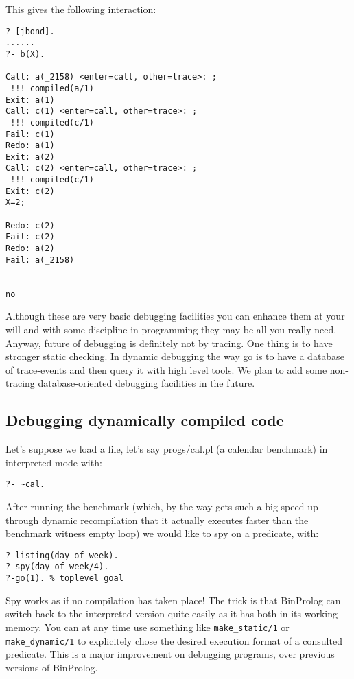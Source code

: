\documentclass{article}
\begin{document}
{\flushleft This} gives the following interaction:


{\small \begin{verbatim}
?-[jbond].
......
?- b(X).

Call: a(_2158) <enter=call, other=trace>: ;
 !!! compiled(a/1)
Exit: a(1)
Call: c(1) <enter=call, other=trace>: ;
 !!! compiled(c/1)
Fail: c(1)
Redo: a(1)
Exit: a(2)
Call: c(2) <enter=call, other=trace>: ;
 !!! compiled(c/1)
Exit: c(2)
X=2;

Redo: c(2)
Fail: c(2)
Redo: a(2)
Fail: a(_2158)


no
\end{verbatim}}

{\flushleft Although} these are very basic debugging facilities you can
enhance them at your will and with some discipline in programming they
may be all you really need.  Anyway, future of debugging is definitely
not by tracing.  One thing is to have stronger static checking. In
dynamic debugging the way go is to have a database of trace-events and
then query it with high level tools.  We plan to add some non-tracing
database-oriented debugging facilities in the future.

\subsection{Debugging dynamically compiled code}

Let's suppose we load a file, let's say progs/cal.pl (a calendar
benchmark) in interpreted mode with:

\begin{verbatim}
?- ~cal.
\end{verbatim}

After running the benchmark (which, by the way gets such a big
speed-up through dynamic recompilation that it actually executes
faster than the benchmark witness empty loop) we would like to spy
on a predicate, with:

\begin{verbatim}
?-listing(day_of_week).
?-spy(day_of_week/4).
?-go(1). % toplevel goal
\end{verbatim}

Spy works as if no compilation has taken place! The trick is
that BinProlog can switch back to the interpreted version quite easily
as it has both in its working memory. You can at any time use
something like {\tt make\_static/1} or {\tt make\_dynamic/1} to explicitely chose
the desired execution format of a consulted predicate.
This is a major improvement on debugging programs, over previous
versions of BinProlog.
\end{document}
